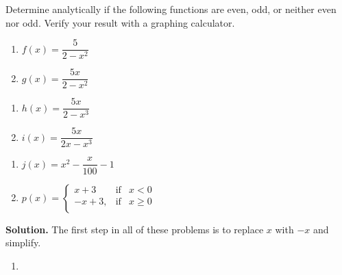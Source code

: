 \begin{ex}  Determine analytically if the following functions are even, odd, or neither even nor odd.  Verify your result with a graphing calculator.

\setlength{\extrarowheight}{2pt}

\begin{multicols}{2}
\begin{enumerate}

\item  $f(x) = \dfrac{5}{2 - x^2}$ 
\item  $g(x) = \dfrac{5x}{2 - x^2}$  

\setcounter{HW}{\value{enumi}}
\end{enumerate}
\end{multicols}

\begin{multicols}{2}
\begin{enumerate}
\setcounter{enumi}{\value{HW}}

\item  $h(x) = \dfrac{5x}{2 - x^3}$
\item  $i(x) = \dfrac{5x}{2x - x^3}$ 

\setcounter{HW}{\value{enumi}}
\end{enumerate}
\end{multicols}

\begin{multicols}{2}
\begin{enumerate}
\setcounter{enumi}{\value{HW}}

\item  $j(x) = x^2 - \dfrac{x}{100}-1$ 
\item  $p(x) = \left\{ \begin{array}{rcl} x+3 & \text{if} &  x < 0 \\ -x+3, & \mbox{if} & x \geq 0 \\ \end{array} \right.$

\setcounter{HW}{\value{enumi}}
\end{enumerate}
\end{multicols}

\medskip

{\bf Solution.} The first step in all of these problems is to replace $x$ with $-x$ and simplify.

\begin{enumerate}

\setlength{\extrarowheight}{8pt}

\item  \[ \begin{array}{rclr}   


\end{array}\]
\end{enumerate}
\end{ex}

